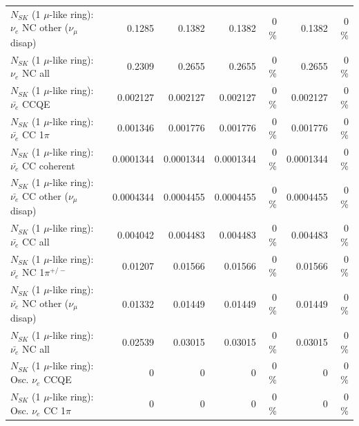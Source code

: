 \begin{table}
\begin{tabular}{| l | r | r | r  r | r  r |}
                $N_{SK}$ (1 $\mu$-like ring): $\nu_e$ NC other ($\nu_\mu$ disap) &          0.1285 &          0.1382 &          0.1382 &        0 \%  &          0.1382 &        0 \%  \\ 
                                  $N_{SK}$ (1 $\mu$-like ring): $\nu_{e}$ NC all &          0.2309 &          0.2655 &          0.2655 &        0 \%  &          0.2655 &        0 \%  \\ 
\hline
\hline
\hline
                                $N_{SK}$ (1 $\mu$-like ring): $\bar{\nu_e}$ CCQE &        0.002127 &        0.002127 &        0.002127 &        0 \%  &        0.002127 &        0 \%  \\ 
                           $N_{SK}$ (1 $\mu$-like ring): $\bar{\nu_e}$ CC 1$\pi$ &        0.001346 &        0.001776 &        0.001776 &        0 \%  &        0.001776 &        0 \%  \\ 
                         $N_{SK}$ (1 $\mu$-like ring): $\bar{\nu_e}$ CC coherent &       0.0001344 &       0.0001344 &       0.0001344 &        0 \%  &       0.0001344 &        0 \%  \\ 
          $N_{SK}$ (1 $\mu$-like ring): $\bar{\nu_e}$ CC other ($\nu_\mu$ disap) &       0.0004344 &       0.0004455 &       0.0004455 &        0 \%  &       0.0004455 &        0 \%  \\ 
                            $N_{SK}$ (1 $\mu$-like ring): $\bar{\nu_{e}}$ CC all &        0.004042 &        0.004483 &        0.004483 &        0 \%  &        0.004483 &        0 \%  \\ 
\hline
                     $N_{SK}$ (1 $\mu$-like ring): $\bar{\nu_e}$ NC 1$\pi^{+/-}$ &         0.01207 &         0.01566 &         0.01566 &        0 \%  &         0.01566 &        0 \%  \\ 
          $N_{SK}$ (1 $\mu$-like ring): $\bar{\nu_e}$ NC other ($\nu_\mu$ disap) &         0.01332 &         0.01449 &         0.01449 &        0 \%  &         0.01449 &        0 \%  \\ 
                            $N_{SK}$ (1 $\mu$-like ring): $\bar{\nu_{e}}$ NC all &         0.02539 &         0.03015 &         0.03015 &        0 \%  &         0.03015 &        0 \%  \\ 
\hline
\hline
\hline
                                 $N_{SK}$ (1 $\mu$-like ring): Osc. $\nu_e$ CCQE &               0 &               0 &               0 &        0 \%  &               0 &        0 \%  \\ 
                            $N_{SK}$ (1 $\mu$-like ring): Osc. $\nu_e$ CC 1$\pi$ &               0 &               0 &               0 &        0 \%  &               0 &        0 \%  \\ 

\end{tabular}
\end{table}
